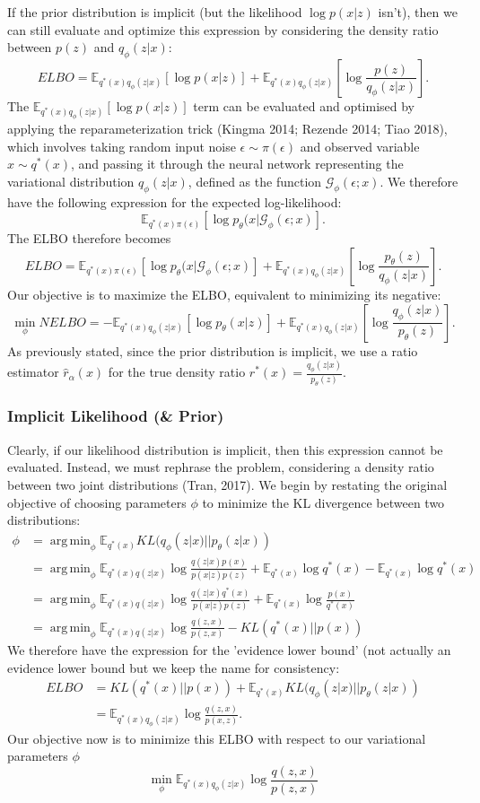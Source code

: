 \documentclass[a4paper,12pt]{article}
\DeclareMathOperator*{\argmin}{arg\,min}
\numberwithin{equation}{section}
\begin{document}
If the prior distribution is implicit (but the likelihood $\log p(x|z)$ isn't), then we can still evaluate and optimize this expression by considering the density ratio between $p(z)$ and $q_\phi (z|x)$:
\[ELBO = \mathbb{E}_{q^*(x)q_\phi(z|x)}\left[\log p(x|z)\right]+\mathbb{E}_{q^*(x)q_\phi(z|x)}\left[\log \frac{p(z)}{q_\phi(z|x)}\right].\]
The $\mathbb{E}_{q^*(x)q_\phi(z|x)}\left[\log p(x|z)\right]$ term can be evaluated and optimised by applying the reparameterization trick (Kingma 2014; Rezende 2014; Tiao 2018), which involves taking random input noise $\epsilon\sim \pi(\epsilon)$ and observed variable $x\sim q^*(x)$, and passing it through the neural network representing the variational distribution $q_\phi(z|x)$, defined as the function $\mathcal{G}_\phi(\epsilon;x)$. We therefore have the following expression for the expected log-likelihood:
\[\mathbb{E}_{q^*(x)\pi(\epsilon)}[\log p_\theta (x|\mathcal{G}_\phi(\epsilon;x)].\]
The ELBO therefore becomes
\[ELBO = \mathbb{E}_{q^*(x)\pi(\epsilon)}[\log p_\theta (x|\mathcal{G}_\phi(\epsilon;x)]+\mathbb{E}_{q^*(x)q_\phi(z|x)}\left[\log \frac{p_\theta(z)}{q_\phi(z|x)}\right].\]
Our objective is to maximize the ELBO, equivalent to minimizing its negative:
\[\min_\phi NELBO = -\mathbb{E}_{q^*(x)q_\phi(z|x)}\left[\log p_\theta(x|z)\right]+\mathbb{E}_{q^*(x)q_\phi(z|x)}\left[\log \frac{q_\phi(z|x)}{p_\theta(z)}\right].\]
As previously stated, since the prior distribution is implicit, we use a ratio estimator $\hat{r}_\alpha(x)$ for the true density ratio $r^*(x)=\frac{q_\phi(z|x)}{p_\theta(z)}$.
\newpage
\subsubsection{Implicit Likelihood (\& Prior)}
Clearly, if our likelihood distribution is implicit, then this expression cannot be evaluated. Instead, we must rephrase the problem, considering a density ratio between two joint distributions  (Tran, 2017). We begin by restating the original objective of choosing parameters $\phi$ to minimize the KL divergence between two distributions:
\begin{align*}
\phi &=\argmin_\phi \mathbb{E}_{q^*(x)}KL(q_\phi(z|x)||p_\theta (z|x))\\
&=\argmin_\phi\mathbb{E}_{q^*(x)q(z|x)}\log \frac{q(z|x)p(x)}{p(x|z)p(z)}+\mathbb{E}_{q^*(x)}\log q^*(x)-\mathbb{E}_{q^*(x)}\log q^*(x)\\
&=\argmin_\phi\mathbb{E}_{q^*(x)q(z|x)}\log \frac{q(z|x)q^*(x)}{p(x|z)p(z)}+\mathbb{E}_{q^*(x)}\log \frac{p(x)}{q^*(x)}\\
&= \argmin_\phi\mathbb{E}_{q^*(x)q(z|x)}\log \frac{q(z,x)}{p(z,x)}-KL(q^*(x)||p(x))
\end{align*}
We therefore have the expression for the 'evidence lower bound' (not actually an evidence lower bound but we keep the name for consistency:
\begin{align*}
ELBO &= KL(q^*(x)||p(x))+\mathbb{E}_{q^*(x)}KL(q_\phi(z|x)||p_\theta(z|x))\\
&=\mathbb{E}_{q^*(x)q_\phi(z|x)}\log \frac{q(z,x)}{p(x,z)}.
\end{align*}
Our objective now is to minimize this ELBO with respect to our variational parameters $\phi$
\[\min_\phi \mathbb{E}_{q^*(x)q_\phi(z|x)}\log \frac{q(z,x)}{p(z,x)}\]
\end{document}
